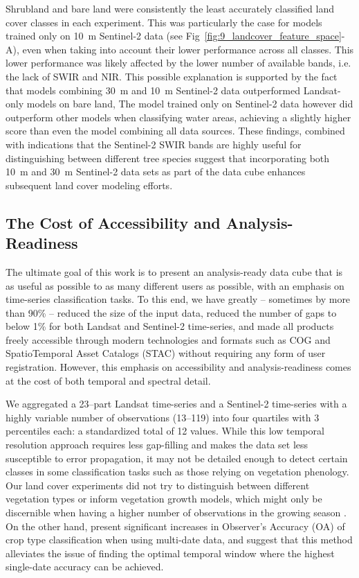 Shrubland and bare land were consistently the least accurately classified land cover classes in each experiment. This was particularly the case for models trained only on 10~m Sentinel-2 data (see Fig\@~\ref{fig:9_landcover_feature_space}-A), even when taking into account their lower performance across all classes. This lower performance was likely affected by the lower number of available bands, i.e. the lack of SWIR and NIR. This possible explanation is supported by the fact that models combining 30~m and 10~m Sentinel-2 data outperformed Landsat-only models on bare land,  The model trained only on Sentinel-2 data however did outperform other models when classifying water areas, achieving a slightly higher score than even the model combining all data sources. These findings, combined with indications that the Sentinel-2 SWIR bands are highly useful for distinguishing between different tree species \citep{immitzer2019optimal} suggest that incorporating both 10~m and 30~m Sentinel-2 data sets as part of the data cube enhances subsequent land cover modeling efforts.

\subsection*{The Cost of Accessibility and Analysis-Readiness}
    
The ultimate goal of this work is to present an analysis-ready data cube that is as useful as possible to as many different users as possible, with an emphasis on time-series classification tasks. To this end, we have greatly -- sometimes by more than 90\% -- reduced the size of the input data, reduced the number of gaps to below 1\% for both Landsat and Sentinel-2 time-series, and made all products freely accessible through modern technologies and formats such as COG and SpatioTemporal Asset Catalogs (STAC) without requiring any form of user registration. However, this emphasis on accessibility and analysis-readiness comes at the cost of both temporal and spectral detail.

We aggregated a 23--part Landsat time-series and a Sentinel-2 time-series with a highly variable number of observations (13--119) into four quartiles with 3 percentiles each: a standardized total of 12 values. While this low temporal resolution approach requires less gap-filling and makes the data set less susceptible to error propagation, it may not be detailed enough to detect certain classes in some classification tasks such as those relying on vegetation phenology. Our land cover experiments did not try to distinguish between different vegetation types or inform vegetation growth models, which might only be discernible when having a higher number of observations in the growing season \citep{zhao2011evaluation}. On the other hand, \citet{vuolo2018much} present significant increases in Observer's Accuracy (OA) of crop type classification when using multi-date data, and suggest that this method alleviates the issue of finding the optimal temporal window where the highest single-date accuracy can be achieved.

